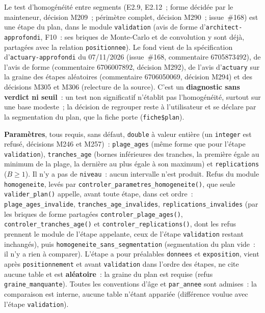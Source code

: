 \documentclass[a4paper,11pt]{article}
\newcommand{\code}[1]{\texttt{\small #1}}
\begin{document}
{\sloppy Le test d'homogénéité entre segments (E2.9, E2.12~; forme décidée par
le mainteneur, décision M209~; périmètre complet, décision M290~;
issue~\#168) est une étape du plan, dans le module \code{validation}
(avis de forme d'\code{architect-approfondi}, F10~: ses briques de
Monte-Carlo et de convolution y sont déjà, partagées avec la relation
\code{positionnee}). Le fond vient de la spécification
d'\code{actuary-approfondi} du 07/11/2026 (issue~\#168, commentaire
6705873492), de l'avis de forme (commentaire 6706007892, décision M292),
de l'avis d'\code{actuary} sur la graine des étapes aléatoires
(commentaire 6706050069, décision M294) et des décisions M305 et M306
(relecture de la source). C'est un \textbf{diagnostic sans verdict ni
seuil}~: un test non significatif n'établit pas l'homogénéité, surtout sur
une base modeste~; la décision de regrouper reste à l'utilisateur et se
déclare par la segmentation du plan, que la fiche porte
(\code{fiche\$plan}).\par}

\medskip
{\sloppy \textbf{Paramètres}, tous requis, sans défaut, \code{double} à valeur
entière (un \code{integer} est refusé, décisions M246 et M257)~:
\code{plage\_ages} (même forme que pour l'étape \code{validation}),
\code{tranches\_age} (bornes inférieures des tranches, la première égale au
minimum de la plage, la dernière au plus égale à son maximum) et
\code{replications} ($B \ge 1$). Il n'y a pas de \code{niveau}~: aucun
intervalle n'est produit. Refus du module \code{homogeneite}, levés par
\code{controler\_parametres\_homogeneite()}, que seule
\code{valider\_plan()} appelle, avant toute étape, dans cet ordre~:
\code{plage\_ages\_invalide}, \code{tranches\_age\_invalides},
\code{replications\_invalides} (par les briques de forme partagées
\code{controler\_plage\_ages()}, \code{controler\_tranches\_age()} et
\code{controler\_replications()}, dont les refus prennent le module de
l'étape appelante, ceux de l'étape \code{validation} restant inchangés),
puis \code{homogeneite\_sans\_segmentation} (segmentation du plan vide~: il
n'y a rien à comparer). L'étape a pour préalables \code{donnees} et
\code{exposition}, vient après \code{positionnement} et avant
\code{validation} dans l'ordre des étapes, ne cite aucune table et est
\textbf{aléatoire}~: la graine du plan est requise (refus
\code{graine\_manquante}). Toutes les conventions d'âge et
\code{par\_annee} sont admises~: la comparaison est interne, aucune table
n'étant appariée (différence voulue avec l'étape \code{validation}).\par}
\end{document}
